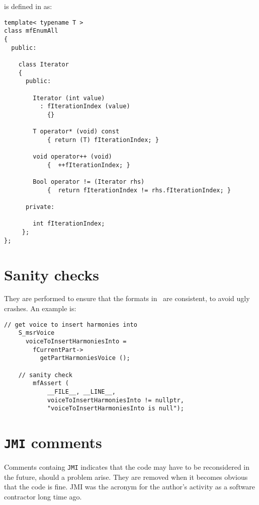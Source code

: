 \newpage

 is defined in  as:
\begin{lstlisting}[language=CPlusPlus]
template< typename T >
class mfEnumAll
{
  public:

    class Iterator
    {
      public:

        Iterator (int value)
          : fIterationIndex (value)
            {}

        T operator* (void) const
            { return (T) fIterationIndex; }

        void operator++ (void)
            {  ++fIterationIndex; }

        Bool operator != (Iterator rhs)
            {  return fIterationIndex != rhs.fIterationIndex; }

      private:

        int fIterationIndex;
     };
};
\end{lstlisting}


\section{Sanity checks}

They are performed to ensure that the formats in \mf\ are consistent, to avoid ugly crashes. An example is:
\begin{lstlisting}[language=CPlusPlus]
    // get voice to insert harmonies into
    S_msrVoice
      voiceToInsertHarmoniesInto =
        fCurrentPart->
          getPartHarmoniesVoice ();

    // sanity check
		mfAssert (
			__FILE__, __LINE__,
			voiceToInsertHarmoniesInto != nullptr,
			"voiceToInsertHarmoniesInto is null");
\end{lstlisting}


\section{{\tt JMI} comments}

Comments containg {\tt JMI} indicates that the code may have to be reconsidered in the future, should a problem arise. They are removed when it becomes obvious that the code is fine. JMI was the acronym for the author's activity as a software contractor long time ago.


